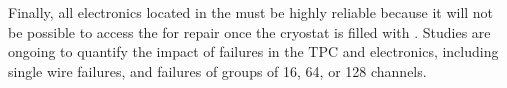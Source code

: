 Finally, all electronics located in the \lar must 
be highly reliable because it will not be possible to access the  for repair once the cryostat is filled with \lar. Studies are ongoing to quantify the impact of failures in the TPC and electronics, including single wire failures, and failures of groups of \num{16}, \num{64}, or \num{128} channels.




